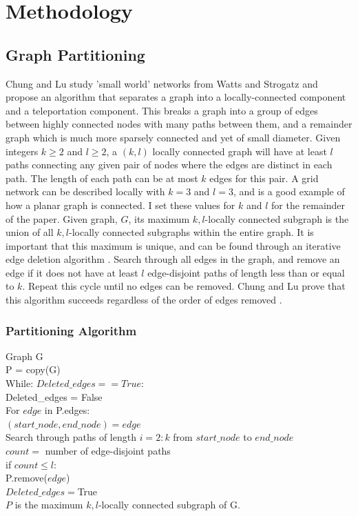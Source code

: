 \documentclass{article}
\begin{document}
\section{Methodology}
\subsection{Graph Partitioning}
Chung and Lu study 'small world' networks from Watts and Strogatz \cite{Watts:1998} and propose an algorithm that separates a graph into a locally-connected component and a teleportation component. This breaks a graph into a group of edges between highly connected nodes with many paths between them, and a remainder graph which is much more sparsely
connected and yet of small diameter. Given integers $k \geq 2$ and $l \geq 2$, a $(k,l)$ locally connected graph will have at least $l$ paths connecting any given pair of nodes where the edges are distinct in each path. The length of each path can be at most $k$ edges for this pair. A grid network can be described locally with $k=3$ and $l=3$, and is a good example of how a planar graph is connected. I set these values for $k$ and $l$ for the remainder of the paper. Given graph, $G$, its maximum $k,l$-locally connected subgraph is the union of all $k,l$-locally connected subgraphs within the entire graph. It is important that this maximum is unique, and can be found through an iterative edge deletion algorithm \cite{Chung:2004}. Search through all edges in the graph, and remove an edge if it does not have at least $l$ edge-disjoint paths of length less than or equal to $k$. Repeat this cycle until no edges can be removed. Chung and Lu prove that this algorithm succeeds regardless of the order of edges removed \cite{Chung:2004}.

\subsubsection{Partitioning Algorithm}
\begin{spacing}{1}
Graph G\\
P = copy(G)\\
While: $Deleted\_edges == True$:\\
\indent Deleted\_edges = False\\
\indent For $edge$ in P.edges:\\
\indent \indent $(start\_node, end\_node) = edge$\\
\indent \indent Search through paths of length $i=2:k$ from $start\_node$ to $end\_node$\\
\indent \indent $count =$  number of edge-disjoint paths\\
\indent \indent if $count \leq l$:\\
\indent \indent \indent P.remove($edge$)\\
\indent \indent \indent $Deleted\_edges = $True\\
$P$ is the maximum $k,l$-locally connected subgraph of G.
\end{spacing}	
\end{document}
